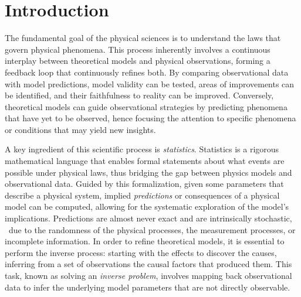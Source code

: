 \chapter{Introduction} \label{sec:introduction}

The fundamental goal of the physical sciences is to understand the laws that govern physical phenomena.
This process inherently involves a continuous interplay between theoretical models and physical observations, forming a feedback loop that continuously refines both. By comparing observational data with model predictions, model validity can be tested, areas of improvements can be identified, and their faithfulness to reality can be improved. Conversely, theoretical models can guide observational strategies by predicting phenomena that have yet to be observed, hence focusing the attention to specific phenomena or conditions that may yield new insights.

A key ingredient of this scientific process is \emph{statistics}. Statistics is a rigorous mathematical language that enables formal statements about what events are possible under physical laws, thus bridging the gap between physics models and observational data.
Guided by this formalization, given some parameters that describe a physical system, implied \emph{predictions} or consequences of a physical model can be computed, allowing for the systematic exploration of the model's implications. Predictions are almost never exact and are intrinsically stochastic, \eg\ due to the randomness of the physical processes, the measurement processes, or incomplete information.
In order to refine theoretical models, it is essential to perform the inverse process: starting with the effects to discover the causes, inferring from a set of observations the causal factors that produced them. This task, known as solving an \emph{inverse problem}, involves mapping back observational data to infer the underlying model parameters that are not directly observable.

